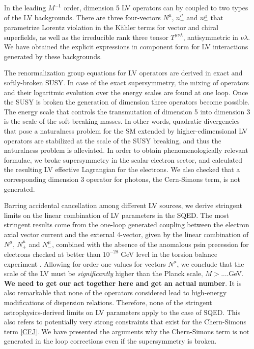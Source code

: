 \documentclass[12pt]{revtex4}
\begin{document}
In the leading $M^{-1}$ order, dimension 5 LV operators can by coupled to
two types of the LV backgrounds. There are three four-vectors 
$N^\mu$, $n^\mu_+$ and $n^{\mu}_-$
that parametrize Lorentz violation in the K\"ahler terms for vector and chiral superfields, 
as well as the irreducible rank three tensor $T^{\mu\nu\lambda}$, antisymmetric in $\nu\lambda$. 
We have obtained the explicit expressions in component form for LV interactions generated by these 
backgrounds. 

The renormalization group equations for LV operators are derived 
in exact and softly-broken SUSY. In case of the exact supersymmetry, 
the mixing of operators and their logaritmic evolution over the energy scales are 
found at one loop. Once the SUSY is broken the generation of dimension 
three operators become possible. The energy scale that controls the transmutation 
of dimension 5 into dimension 3 is the scale of the soft-breaking masses. 
In other words, quadratic divergencies that pose a naturalness problem for the 
SM extended by higher-edimensional LV operators are stabilized at the scale of the 
SUSY breaking, and thus the naturalness problem is alleviated. 
In order to obtain phenomenologically relevant formulae, we broke supersymmetry in the
scalar electron sector, and calculated the resulting LV effective Lagrangian for the 
electrons. We also checked that a corresponding dimension 3 operator for photons, 
the Cern-Simons term, is not generated. 

Barring accidental cancellation among different LV sources, we derive 
stringent limits on the linear combination of LV parameters in the 
SQED. The most stringent results come from the one-loop generated 
coupling between the electron axial vector current and the external 
4-vector, given by the linear combination of $N^\mu$, $N^\mu_+$ and $N^{\mu}_-$,
combined with the absence of the anomalous psin precession for 
electrons checked at better than $10^{-28}$ GeV level in the 
torsion balance experiment \cite{Heckel:1999sy}. Allowing for order one values for 
vectors $N^\mu$, we conclude that the scale of the LV must be {\em significantly}
higher than the Planck scale, $M> $....GeV. {\bf We need to get our act together here 
and get an actual number}. It is also remarkable that none of the 
operators considered lead to high-energy modifications of dispersion relations. 
Therefore, none of the stringent astrophysics-derived limits on LV parameters 
\cite{Ted1,GK} apply to the case of SQED. This also refers to potentially very strong 
 constraints that exist for the Chern-Simons term \ref{CFJ}. We have presented 
 the arguments why the Chern-Simons term is not generated in the loop corrections 
 even if the supersymmetry is broken. 
 
\end{document}

